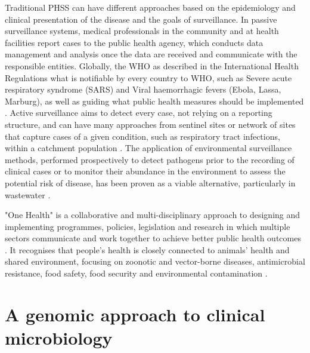 Traditional PHSS can have different approaches based on the epidemiology and clinical presentation of the disease and the goals of surveillance. In passive surveillance systems, medical professionals in the community and at health facilities report cases to the public health agency, which conducts data management and analysis once the data are received and communicate with the responsible entities. Globally, the WHO as described in the International Health Regulations what is notifiable by every country to WHO, such as Severe acute respiratory syndrome (SARS) and Viral haemorrhagic fevers
(Ebola, Lassa, Marburg), as well as guiding what public health measures should be implemented \citep{world_health_organization_international_2005}. Active surveillance aims to detect every case, not relying on a reporting structure, and can have many approaches from sentinel sites or network of sites that capture cases of a given condition, such as respiratory tract infections, within a catchment population \citep{murray_infectious_2017, melo-cristino_estudo_2006}. The application of environmental surveillance methods, performed prospectively to detect pathogens prior to the recording of clinical cases or to monitor their abundance in the environment to assess the potential risk of disease, has been proven as a viable alternative, particularly in wastewater \citep{andrews_environmental_2020, mcweeney_demonstration_1894, baker_combined_2011, larsen_tracking_2020}.  

"One Health" is a collaborative and multi-disciplinary approach to designing and implementing programmes, policies, legislation and research in which multiple sectors communicate and work together to achieve better public health outcomes \citep{mackenzie_one_2019}. It recognises that people’s health is closely connected to animals’ health and shared environment, focusing on zoonotic and vector-borne diseases, antimicrobial resistance, food safety, food security and environmental contamination \citep{rugarabamu_one-health_2021}.


\section{A genomic approach to clinical microbiology} \label{sec:genomics_approach}

